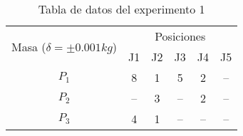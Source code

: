 \documentclass[../main]{subfiles}
\begin{document}
\begin{table}[H]
    \centering
    \begin{tabular}{c|c|c|c|c|c}
        \hline
        \multirow{2}{3cm}{Masa ($\delta = \pm 0.001kg$)}     
         & \multicolumn{5}{|c}{Posiciones}\\
        \cline{2-6}
              &  J1  &  J2  &  J3  &  J4  &  J5 \\  
        \hline
        $P_1$ &  8   &  1   &  5   &  2   &  -- \\   
        $P_2$ &  --  &  3   &  --  &  2   &  -- \\ 
        $P_3$ &  4   &  1   &  --  &  --  &  -- \\ 
        \hline
    \end{tabular}
    \label{ref:table1}
    \caption{Tabla de datos del experimento 1}
\end{table}
\end{document}
